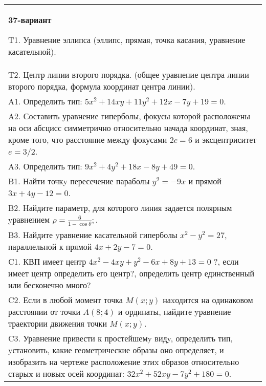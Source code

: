 \documentclass{article}
\begin{document}
\begin{tabular}{m{17cm}}
\textbf{37-вариант}
\newline

T1. Уравнение эллипса (эллипс, прямая, точка касания, уравнение касательной).\\

T2. Центр линии второго порядка. (общее уравнение центра линии второго порядка, формула координат центра линии).\\

A1. Определить тип: $5x^{2}+14xy+11y^{2}+12x-7y+19=0$.\\

A2. Составить уравнение гиперболы, фокусы которой расположены на оси абсцисс симметрично относительно начада координат, зная, кроме того, что расстояние между фокусами $2c=6$ и эксцентриситет $e=3/2$.\\

A3. Определить тип: $9x^{2}+4y^{2}+18x-8y+49=0$.\\

B1. Найти точкy пересечение параболы $y^{2} = - 9x$ и прямой $3x + 4y - 12 = 0$.  \\

B2. Найдите параметр, для которого линия задается полярным yравнением $\rho = \frac{6}{1 - \cos \theta};$.  \\

B3. Найдите yравнение касательной гиперболы $x^{2} - y^{2} = 27$, параллельной к прямой $4x + 2y - 7 = 0$.  \\

C1. КВП имеет центр $4x^{2}-4xy+y^{2}-6x+8y+13=0$ ?, если имеет центр определить его центр?, определить центр единственный или бесконечно много?  \\

C2. Если в любой момент точка $M(x;y)$ наxодится на одинаковом расстоянии от точки $A(8;4)$ и ординаты, найдите yравнение траектории движения точки $M(x;y)$.  \\

C3. Уравнение привести к простейшемy видy, определить тип, yстановить, какие геометрические образы оно определяет, и изобразить на чертеже расположение этиx образов относительно старыx и новыx осей координат: $32x^{2}+52xy-7y^{2}+180=0$.  \\

\end{tabular}
\vspace{1cm}
\end{document}
